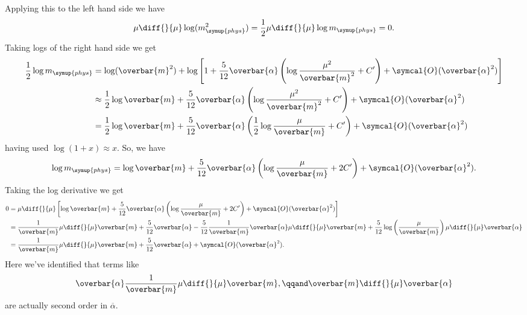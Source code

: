 \documentclass[fleqn]{NotesClass}
\newcommand{\order}{\symcal{O}}
\newcommand{\phys}{\symup{phys}}
\begin{document}
    Applying this to the left hand side we have
    \begin{equation}
        \mu \diff{}{\mu} \log (m_{\phys}^2) = \frac{1}{2}\mu \diff{}{\mu} \log m_{\phys} = 0.
    \end{equation}
    Taking logs of the right hand side we get
    \begin{align}
        \frac{1}{2}\log m_{\phys} &= \log(\overbar{m}^2) + \log\left[ 1 + \frac{5}{12}\overbar{\alpha}\left( \log\frac{\mu^2}{\overbar{m}^2} + C' \right) + \order(\overbar{\alpha}^2) \right]\\
        &\approx \frac{1}{2} \log \overbar{m} + \frac{5}{12}\overbar{\alpha}\left( \log\frac{\mu^2}{\overbar{m}^2} + C' \right) + \order(\overbar{\alpha}^2)\\
        &= \frac{1}{2} \log\overbar{m} + \frac{5}{12}\overbar{\alpha}\left( \frac{1}{2}\log\frac{\mu}{\overbar{m}} + C' \right) + \order(\overbar{\alpha}^2)
    \end{align}
    having used \(\log(1 + x) \approx x\).
    So, we have
    \begin{equation}
        \log m_{\phys} = \log\overbar{m} + \frac{5}{12}\overbar{\alpha}\left( \log\frac{\mu}{\overbar{m}} + 2C' \right) + \order(\overbar{\alpha}^2).
    \end{equation}
    Taking the log derivative we get
    \begin{align}
        0 &= \mu \diff{}{\mu}\left[ \log\overbar{m} + \frac{5}{12}\overbar{\alpha}\left( \log\frac{\mu}{\overbar{m}} + 2C' \right) + \order(\overbar{\alpha}^2) \right]\\
        &= \frac{1}{\overbar{m}}\mu \diff{}{\mu} \overbar{m} + \frac{5}{12}\overbar{\alpha} - \frac{5}{12}\frac{1}{\overbar{m}} \overbar{\alpha} \mu \diff{}{\mu} \overbar{m} + \frac{5}{12} \log\left( \frac{\mu}{\overbar{m}} \right) \mu \diff{}{\mu} \overbar{\alpha}\\
        &= \frac{1}{\overbar{m}} \mu \diff{}{\mu} \overbar{m} + \frac{5}{12}\overbar{\alpha} + \order(\overbar{\alpha}^2).
    \end{align}
    Here we've identified that terms like
    \begin{equation}
        \overbar{\alpha}\frac{1}{\overbar{m}} \mu \diff{}{\mu} \overbar{m}, \qqand \overbar{m} \diff{}{\mu}\overbar{\alpha}
    \end{equation}
    are actually second order in \(\overbar{\alpha}\).
    
\end{document}
